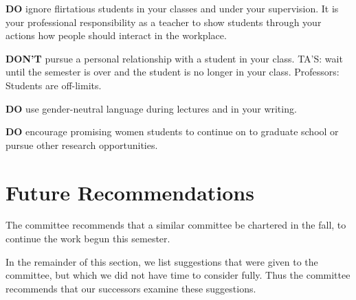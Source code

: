\smallskip

\noindent
{\bf DO} ignore  flirtatious students in your
classes and under your supervision. It is your professional
responsibility as a teacher to show students through your actions how 
people should interact in the workplace.

\smallskip

\noindent
{\bf DON'T} pursue a personal relationship with a
student in your class.
TA'S:  wait until the semester is over and the student is no longer in
your class. Professors: Students are off-limits. 

\bigskip

\noindent
{\bf DO} use gender-neutral language during lectures and in your writing.  


\smallskip

\noindent
{\bf DO} encourage promising women students to continue on to graduate school or
pursue other research opportunities.

\newpage


\section{Future Recommendations}
\label{future}

The committee recommends that a similar committee be chartered
in the fall, to continue the work begun this semester.

In the remainder of this section, we list suggestions that
were given to the committee, but which we did not have
time to consider fully.
Thus the committee recommends that our successors examine these suggestions.

